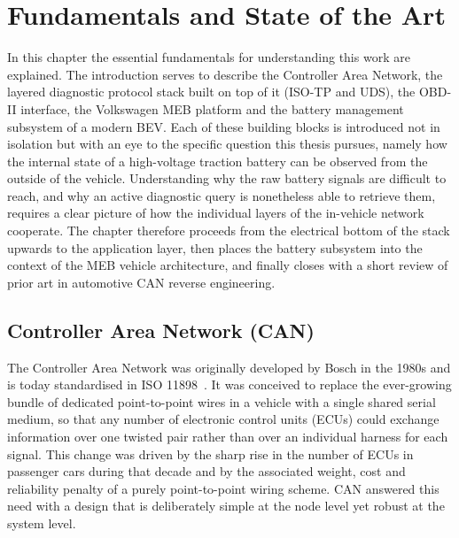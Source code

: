 \documentclass[11pt,a4paper,oneside,parskip=half]{scrreprt}
\begin{document}
\chapter{Fundamentals and State of the Art}
In this chapter the essential fundamentals for understanding this work are explained. The introduction serves to describe the Controller Area Network, the layered diagnostic protocol stack built on top of it (ISO-TP and UDS), the OBD-II interface, the Volkswagen MEB platform and the battery management subsystem of a modern BEV. Each of these building blocks is introduced not in isolation but with an eye to the specific question this thesis pursues, namely how the internal state of a high-voltage traction battery can be observed from the outside of the vehicle. Understanding why the raw battery signals are difficult to reach, and why an active diagnostic query is nonetheless able to retrieve them, requires a clear picture of how the individual layers of the in-vehicle network cooperate. The chapter therefore proceeds from the electrical bottom of the stack upwards to the application layer, then places the battery subsystem into the context of the MEB vehicle architecture, and finally closes with a short review of prior art in automotive CAN reverse engineering.

\section{Controller Area Network (CAN)}
The Controller Area Network was originally developed by Bosch in the 1980s and is today standardised in ISO 11898~\cite{iso11898}. It was conceived to replace the ever-growing bundle of dedicated point-to-point wires in a vehicle with a single shared serial medium, so that any number of electronic control units (ECUs) could exchange information over one twisted pair rather than over an individual harness for each signal. This change was driven by the sharp rise in the number of ECUs in passenger cars during that decade and by the associated weight, cost and reliability penalty of a purely point-to-point wiring scheme. CAN answered this need with a design that is deliberately simple at the node level yet robust at the system level.
\end{document}
